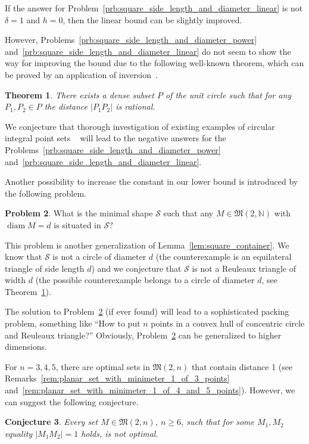 \documentclass[a4paper,14pt]{article} %
\theoremstyle{plain}
\newtheorem{theorem}{Theorem}[section]
\newtheorem{conjecture}[theorem]{Conjecture}
\theoremstyle{definition}
\newtheorem{problem}[theorem]{Problem}
\begin{document}
If the answer for Problem~\ref{prb:square_side_length_and_diameter_linear} is not $\delta = 1$ and $h = 0$,
then the linear bound can be slightly improved.

However, Problems~\ref{prb:square_side_length_and_diameter_power} and~\ref{prb:square_side_length_and_diameter_linear}
do not seem to show the way for improving the bound
due to the following well-known theorem,
which can be proved by an application of inversion~\cite{solymosi2010question}.
\begin{theorem}
	\label{thm:rational_set_on_circle}
	There exists a dense subset $P$ of the unit circle such that for any $P_1, P_2 \in P$
	the distance $|P_1 P_2|$ is rational.
\end{theorem}
We conjecture that thorough investigation of existing examples of circular integral point sets
~\cite{bat2018number,harborth1993upper,piepmeyer1996maximum}
will lead to the negative answers for the
Problems~\ref{prb:square_side_length_and_diameter_power} and~\ref{prb:square_side_length_and_diameter_linear}.

Another possibility to increase the constant in our lower bound is introduced by the following problem.

\begin{problem}
	\label{prb:minimal_shape}
	What is the minimal shape $\mathcal{S}$ such that any $M\in\mathfrak{M}(2,\mathbb{N})$ with $\operatorname{diam} M = d$
	is situated in  $\mathcal{S}$?
\end{problem}
This problem is another generalization of Lemma~\ref{lem:square_container}.
We know that $\mathcal{S}$ is not a circle of diameter $d$
(the counterexample is an equilateral triangle of side length $d$)
and we conjecture that $\mathcal{S}$ is not a Reuleaux triangle of width $d$
(the possible counterexample belongs to a circle of diameter $d$, see Theorem~\ref{thm:rational_set_on_circle}).

The solution to Problem~\ref{prb:minimal_shape} (if ever found) will lead to a sophisticated packing problem,
something like ``How to put $n$ points in a convex hull of concentric circle and Reuleaux triangle?''
Obviously, Problem~\ref{prb:minimal_shape} can be generalized to higher dimensions.


For $n=3,4,5$, there are optimal sets in $\mathfrak{M}(2,n)$ that contain distance 1
(see Remarks~\ref{rem:planar_set_with_minimeter_1_of_3_points} and~\ref{rem:planar_set_with_minimeter_1_of_4_and_5_points}).
However, we can suggest the following conjecture.
\begin{conjecture}
	\label{con:no_optimal_with_edge_1}
	Every set $M\in\mathfrak{M}(2,n)$, $n\geq 6$, such that for some $M_1,M_2$ equality $|M_1 M_2|=1$ holds,
	is not optimal.
\end{conjecture}
\end{document}
